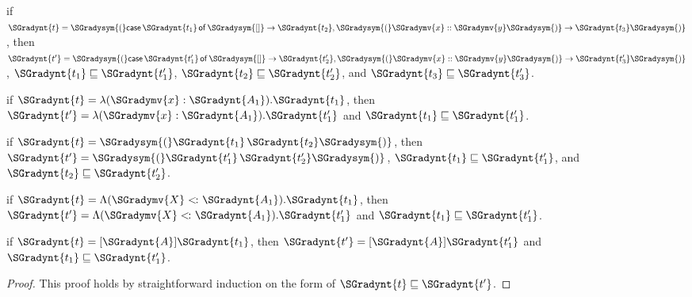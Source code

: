 \begin{lemma}
\begin{enumR}
  \item if $\SGradynt{t} = \SGradysym{(}   \mathsf{case}\, \SGradynt{t_{{\mathrm{1}}}} \,\mathsf{of}\, \SGradysym{[]}  \to  \SGradynt{t_{{\mathrm{2}}}} ,  \SGradysym{(}   \SGradymv{x}  ::  \SGradymv{y}   \SGradysym{)}  \to  \SGradynt{t_{{\mathrm{3}}}}   \SGradysym{)}$, then
    $\SGradynt{t'} = \SGradysym{(}   \mathsf{case}\, \SGradynt{t'_{{\mathrm{1}}}} \,\mathsf{of}\, \SGradysym{[]}  \to  \SGradynt{t'_{{\mathrm{2}}}} ,  \SGradysym{(}   \SGradymv{x}  ::  \SGradymv{y}   \SGradysym{)}  \to  \SGradynt{t'_{{\mathrm{3}}}}   \SGradysym{)}$, $ \SGradynt{t_{{\mathrm{1}}}}  \sqsubseteq  \SGradynt{t'_{{\mathrm{1}}}} $, $ \SGradynt{t_{{\mathrm{2}}}}  \sqsubseteq  \SGradynt{t'_{{\mathrm{2}}}} $, and $ \SGradynt{t_{{\mathrm{3}}}}  \sqsubseteq  \SGradynt{t'_{{\mathrm{3}}}} $.
  \item if $\SGradynt{t} =  \lambda ( \SGradymv{x}  :  \SGradynt{A_{{\mathrm{1}}}} ) .  \SGradynt{t_{{\mathrm{1}}}} $, then $\SGradynt{t'} =  \lambda ( \SGradymv{x}  :  \SGradynt{A_{{\mathrm{1}}}} ) .  \SGradynt{t'_{{\mathrm{1}}}} $ and $ \SGradynt{t_{{\mathrm{1}}}}  \sqsubseteq  \SGradynt{t'_{{\mathrm{1}}}} $.
  \item if $\SGradynt{t} = \SGradysym{(}  \SGradynt{t_{{\mathrm{1}}}} \, \SGradynt{t_{{\mathrm{2}}}}  \SGradysym{)}$, then $\SGradynt{t'} = \SGradysym{(}  \SGradynt{t'_{{\mathrm{1}}}} \, \SGradynt{t'_{{\mathrm{2}}}}  \SGradysym{)}$, $ \SGradynt{t_{{\mathrm{1}}}}  \sqsubseteq  \SGradynt{t'_{{\mathrm{1}}}} $, and $ \SGradynt{t_{{\mathrm{2}}}}  \sqsubseteq  \SGradynt{t'_{{\mathrm{2}}}} $.
  \item if $\SGradynt{t} =  \Lambda ( \SGradymv{X}  <\hspace{-2px}\colon  \SGradynt{A_{{\mathrm{1}}}} ) . \SGradynt{t_{{\mathrm{1}}}} $, then $\SGradynt{t'} =  \Lambda ( \SGradymv{X}  <\hspace{-2px}\colon  \SGradynt{A_{{\mathrm{1}}}} ) . \SGradynt{t'_{{\mathrm{1}}}} $ and $ \SGradynt{t_{{\mathrm{1}}}}  \sqsubseteq  \SGradynt{t'_{{\mathrm{1}}}} $.
  \item if $\SGradynt{t} =  [  \SGradynt{A}  ]  \SGradynt{t_{{\mathrm{1}}}} $, then $\SGradynt{t'} =  [  \SGradynt{A}  ]  \SGradynt{t'_{{\mathrm{1}}}} $ and $ \SGradynt{t_{{\mathrm{1}}}}  \sqsubseteq  \SGradynt{t'_{{\mathrm{1}}}} $.
  \end{enumR}
\end{lemma}
\begin{proof}
  This proof holds by straightforward induction on the form of $ \SGradynt{t}  \sqsubseteq  \SGradynt{t'} $.
\end{proof}

